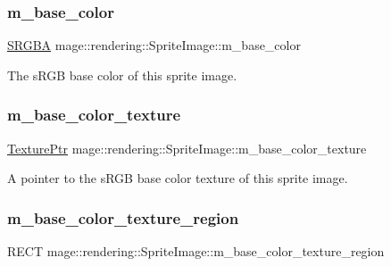 \subsubsection{\texorpdfstring{m\+\_\+base\+\_\+color}{m\_base\_color}}
{\footnotesize\ttfamily \hyperlink{structmage_1_1_s_r_g_b_a}{S\+R\+G\+BA} mage\+::rendering\+::\+Sprite\+Image\+::m\+\_\+base\+\_\+color\hspace{0.3cm}{\ttfamily [private]}}

The s\+R\+GB base color of this sprite image. \hypertarget{classmage_1_1rendering_1_1_sprite_image_a1b68c232550bfc55aa794fcffbeab489}{}\label{classmage_1_1rendering_1_1_sprite_image_a1b68c232550bfc55aa794fcffbeab489} 
\subsubsection{\texorpdfstring{m\+\_\+base\+\_\+color\+\_\+texture}{m\_base\_color\_texture}}
{\footnotesize\ttfamily \hyperlink{namespacemage_1_1rendering_a6f3ae54f825328465b0cdde0f0de4a36}{Texture\+Ptr} mage\+::rendering\+::\+Sprite\+Image\+::m\+\_\+base\+\_\+color\+\_\+texture\hspace{0.3cm}{\ttfamily [private]}}

A pointer to the s\+R\+GB base color texture of this sprite image. \hypertarget{classmage_1_1rendering_1_1_sprite_image_a18de0a4473e2bfee074cd152d1ba2c3e}{}\label{classmage_1_1rendering_1_1_sprite_image_a18de0a4473e2bfee074cd152d1ba2c3e} 
\subsubsection{\texorpdfstring{m\+\_\+base\+\_\+color\+\_\+texture\+\_\+region}{m\_base\_color\_texture\_region}}
{\footnotesize\ttfamily R\+E\+CT mage\+::rendering\+::\+Sprite\+Image\+::m\+\_\+base\+\_\+color\+\_\+texture\+\_\+region\hspace{0.3cm}{\ttfamily [private]}}

